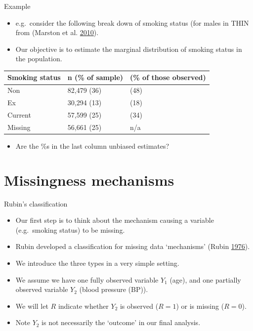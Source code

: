\documentclass[ignorenonframetext,]{beamer}
\providecommand{\tightlist}{%
  \setlength{\itemsep}{0pt}\setlength{\parskip}{0pt}}
\begin{document}
\begin{frame}{Example}
\protect\hypertarget{example}{}

\begin{itemize}
\tightlist
\item
  e.g.~consider the following break down of smoking status (for males in
  THIN from (Marston et al. \protect\hyperlink{ref-Marston2010}{2010}).
\item
  Our objective is to estimate the marginal distribution of smoking
  status in the population.
\end{itemize}

\begin{longtable}[]{@{}lll@{}}
\toprule
Smoking status & n (\% of sample) & (\% of those
observed)\tabularnewline
\midrule
\endhead
Non & 82,479 (36) & (48)\tabularnewline
Ex & 30,294 (13) & (18)\tabularnewline
Current & 57,599 (25) & (34)\tabularnewline
Missing & 56,661 (25) & n/a\tabularnewline
\bottomrule
\end{longtable}

\begin{itemize}
\tightlist
\item
  Are the \%s in the last column unbiased estimates?
\end{itemize}

\end{frame}

\hypertarget{missingness-mechanisms}{%
\section{Missingness mechanisms}\label{missingness-mechanisms}}

\begin{frame}{Rubin's classification}
\protect\hypertarget{rubins-classification}{}

\begin{itemize}
\tightlist
\item
  Our first step is to think about the mechanism causing a variable
  (e.g.~smoking status) to be missing.
\item
  Rubin developed a classification for missing data `mechanisms' (Rubin
  \protect\hyperlink{ref-Rubin:1976}{1976}).
\item
  We introduce the three types in a very simple setting.
\item
  We assume we have one fully observed variable \(Y_{1}\) (age), and one
  partially observed variable \(Y_{2}\) (blood pressure (BP)).
\item
  We will let \(R\) indicate whether \(Y_{2}\) is observed (\(R=1\)) or
  is missing (\(R=0\)).
\item
  Note \(Y_{2}\) is not necessarily the `outcome' in our final analysis.
\end{itemize}

\end{frame}
\end{document}
